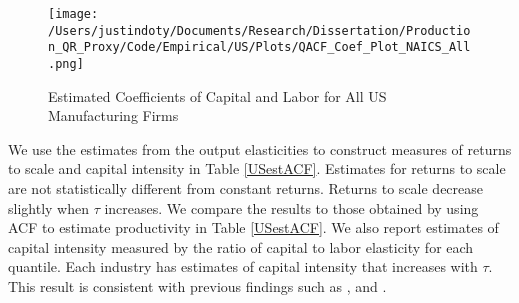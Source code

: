 \documentclass[11pt]{article}
\begin{document}
\begin{figure}[H]
\centering
\caption{Estimated Coefficients of Capital and Labor for All US Manufacturing Firms}
\texttt{[image: /Users/justindoty/Documents/Research/Dissertation/Production\_QR\_Proxy/Code/Empirical/US/Plots/QACF\_Coef\_Plot\_NAICS\_All.png]}
\label{fig:ACFUSallcoef}
\end{figure}

We use the estimates from the output elasticities to construct measures of returns to scale and capital intensity in Table \ref{USestACF}. Estimates for returns to scale are not statistically different from constant returns. Returns to scale decrease slightly when $\tau$ increases. We compare the results to those obtained by using ACF to estimate productivity in Table \ref{USestACF}. We also report estimates of capital intensity measured by the ratio of capital to labor elasticity for each quantile. Each industry has estimates of capital intensity that increases with $\tau$. This result is consistent with previous findings such as \cite{Holmes2008}, \cite{Kumar1999} and \cite{mert}.
\end{document}
